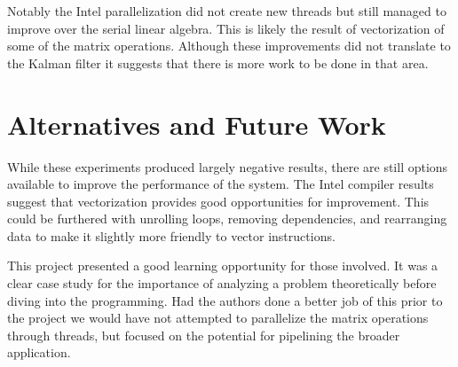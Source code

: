 Notably the Intel parallelization did not create new threads but still managed to improve over the serial linear algebra. This is likely the result of vectorization of some of the matrix operations. Although these improvements did not translate to the Kalman filter it suggests that there is more work to be done in that area.

\section{Alternatives and Future Work}
While these experiments produced largely negative results, there are still options available to improve the performance of  the system. The Intel compiler results suggest that vectorization provides good opportunities for improvement. This could be furthered with unrolling loops, removing dependencies, and rearranging data to make it slightly more friendly to vector instructions. 

This project presented a good learning opportunity for those involved. It was a clear case study for the importance of analyzing a problem theoretically before diving into the programming. Had the authors done a better job of this prior to the project we would have not attempted to parallelize the matrix operations through threads, but focused on the potential for pipelining the broader application. 

